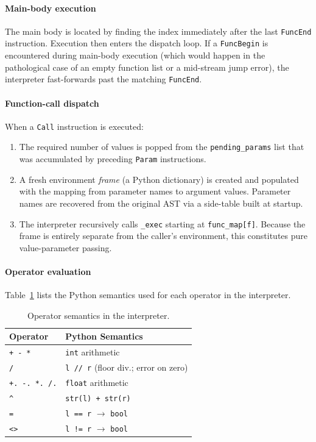 \documentclass[12pt,a4paper]{report}
\begin{document}
\paragraph{Main-body execution}
The main body is located by finding the index immediately after the last
\texttt{FuncEnd} instruction. Execution then enters the dispatch loop.
If a \texttt{FuncBegin} is encountered during main-body execution
(which would happen in the pathological case of an empty function list or
a mid-stream jump error), the interpreter fast-forwards past the matching
\texttt{FuncEnd}.

\paragraph{Function-call dispatch}
When a \texttt{Call} instruction is executed:
\begin{enumerate}
  \item The required number of values is popped from the \texttt{pending\_params}
        list that was accumulated by preceding \texttt{Param} instructions.
  \item A fresh environment \emph{frame} (a Python dictionary) is created and
        populated with the mapping from parameter names to argument values.
        Parameter names are recovered from the original AST via a
        side-table built at startup.
  \item The interpreter recursively calls \texttt{\_exec} starting at
        \texttt{func\_map[f]}. Because the frame is entirely separate from
        the caller's environment, this constitutes pure value-parameter passing.
\end{enumerate}

\paragraph{Operator evaluation}
Table~\ref{tab:opsem} lists the Python semantics used for each operator
in the interpreter.

\begin{table}[H]
\centering
\caption{Operator semantics in the interpreter.}
\label{tab:opsem}
\begin{tabular}{@{} l l @{}}
\toprule
\textbf{Operator} & \textbf{Python Semantics} \\
\midrule
\texttt{+}~\texttt{-}~\texttt{*} & \texttt{int} arithmetic \\
\texttt{/}           & \texttt{l // r} (floor div.; error on zero) \\
\texttt{+.}~\texttt{-.}~\texttt{*.}~\texttt{/.} & \texttt{float} arithmetic \\
\texttt{\^{}}        & \texttt{str(l) + str(r)} \\
\texttt{=}           & \texttt{l == r} $\to$ \texttt{bool} \\
\texttt{<>}          & \texttt{l != r} $\to$ \texttt{bool} \\
\bottomrule
\end{tabular}
\end{table}
\end{document}
